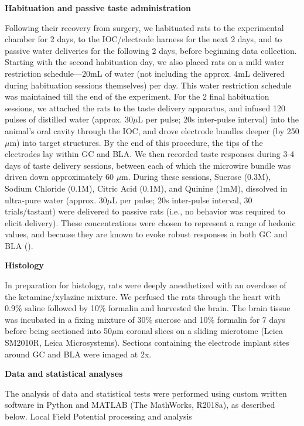 \begin{refsection}
\smallskip
\noindent\textbf{Habituation and passive taste administration}\par
\noindent Following their recovery from surgery, we habituated rats to the experimental chamber for 2 days, to the IOC/electrode harness for the next 2 days, and to passive water deliveries for the following 2 days, before beginning data collection. Starting with the second habituation day, we also placed rats on a mild water restriction schedule—20mL of water (not including the approx. 4mL delivered during habituation sessions themselves) per day. This water restriction schedule was maintained till the end of the experiment. For the 2 final habituation sessions, we attached the rats to the taste delivery apparatus, and infused 120 pulses of distilled water (approx. 30\(\mu\)L per pulse; 20s inter-pulse interval) into the animal’s oral cavity through the IOC, and drove electrode bundles deeper (by 250 \(\mu\)m) into target structures. By the end of this procedure, the tips of the electrodes lay within GC and BLA. We then recorded taste responses during 3-4 days of taste delivery sessions, between each of which the microwire bundle was driven down approximately 60 \(\mu\)m. During these sessions, Sucrose (0.3M), Sodium Chloride (0.1M), Citric Acid (0.1M), and Quinine (1mM), dissolved in ultra-pure water (approx. 30\(\mu\)L per pulse; 20s inter-pulse interval, 30 trials/tastant) were delivered to passive rats (i.e., no behavior was required to elicit delivery). These concentrations were chosen to represent a range of hedonic values, and because they are known to evoke robust responses in both GC and BLA (\cite{fontanini2009a,sadacca2012a}).

\smallskip
\noindent\textbf{Histology}\par
\noindent In preparation for histology, rats were deeply anesthetized with an overdose of the ketamine/xylazine mixture. We perfused the rats through the heart with 0.9\% saline followed by 10\% formalin and harvested the brain. The brain tissue was incubated in a fixing mixture of 30\% sucrose and 10\% formalin for 7 days before being sectioned into 50\(\mu\)m coronal slices on a sliding microtome (Leica SM2010R, Leica Microsystems). Sections containing the electrode implant sites around GC and BLA were imaged at 2x.

\smallskip
\noindent\textbf{Data and statistical analyses}\par
\noindent The analysis of data and statistical tests were performed using custom written software in Python and MATLAB (The MathWorks, R2018a), as described below.
Local Field Potential processing and analysis


\end{refsection}
